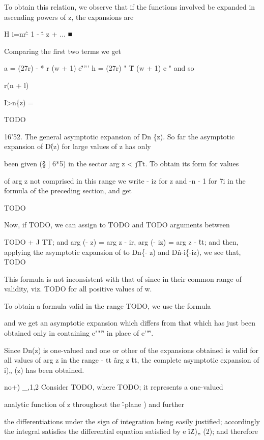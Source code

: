 To obtain this relation, we observe that if the functions involved be
expanded in ascending powers of z, the expansions are

H i=nr\^ - 1 - \^ - z + ... ■

Comparing the first two terms we get

a = (27r) - * r (w + 1) e\^'''' h = (27r) " \^ T (w + 1) e " and so

r(n + l)

I>n\{z) =

TODO

16'52. The general asymptotic expansion of Dn \{z). So far the
asymptotic expansion of D\^ (z) for large values of z has only

been given (§ ] 6*5) in the sector arg z < jTt. To obtain its form for
values

of arg z not comprised in this range we write - iz for z and -n - 1
for 7i in the formula of the preceding section, and get

TODO

Now, if TODO, we can assign to TODO and TODO arguments between

TODO + J TT; and arg (- z) = arg z - ir, arg (- iz) = arg z - \^tt;
and then, applying the asymptotic expansion of to Dn\{- z) and
D\^n-i\{-iz), we see that, TODO

%
%

This formula is not inconsistent with that of since in their
common range of validity, viz. TODO for all positive values of w.

To obtain a formula valid in the range TODO, we use the formula

and we get an asymptotic expansion which differs from that which has
just been obtained only in containing e""'\^' in place of e'"\^'.

Since Dn(z) is one-valued and one or other of the expansions obtained
is valid for all values of arg z in the range - tt \^ arg z \^tt, the
complete asymptotic expansion of i)„ (z) has been obtained.


no+) \_,1,2 Consider TODO, where TODO; it represents a one-valued

analytic function of z throughout the \^-plane ) and further

the differentiations under the sign of integration being easily
justified; accordingly the integral satisfies the differential
equation satisfied by e \~ i\^ Z)„ (2); and therefore

